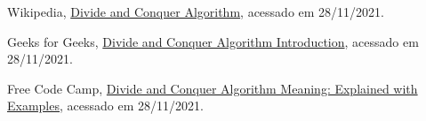 \begin{thebibliography}{10}
  Wikipedia,
  \href{https://en.wikipedia.org/wiki/Divide-and-conquer_algorithm}{Divide and Conquer Algorithm},
  acessado em 28/11/2021.

  Geeks for Geeks,
  \href{https://www.geeksforgeeks.org/divide-and-conquer-algorithm-introduction/}{Divide and Conquer Algorithm Introduction},
  acessado em 28/11/2021.

  Free Code Camp,
  \href{https://www.freecodecamp.org/news/divide-and-conquer-algorithms/}{Divide and Conquer Algorithm Meaning: Explained with Examples},
  acessado em 28/11/2021.

\end{thebibliography}